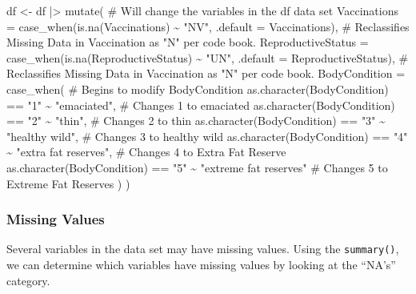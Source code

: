 \documentclass[
  letterpaper,
]{report}
\newenvironment{Shaded}{\begin{snugshade}}{\end{snugshade}}
\newcommand{\AttributeTok}[1]{\textcolor[rgb]{0.40,0.45,0.13}{#1}}
\newcommand{\CommentTok}[1]{\textcolor[rgb]{0.37,0.37,0.37}{#1}}
\newcommand{\FunctionTok}[1]{\textcolor[rgb]{0.28,0.35,0.67}{#1}}
\newcommand{\NormalTok}[1]{\textcolor[rgb]{0.00,0.23,0.31}{#1}}
\newcommand{\OtherTok}[1]{\textcolor[rgb]{0.00,0.23,0.31}{#1}}
\newcommand{\SpecialCharTok}[1]{\textcolor[rgb]{0.37,0.37,0.37}{#1}}
\newcommand{\StringTok}[1]{\textcolor[rgb]{0.13,0.47,0.30}{#1}}
\begin{document}
\begin{Shaded}
\begin{Highlighting}[]
\NormalTok{df }\OtherTok{\textless{}{-}}\NormalTok{ df }\SpecialCharTok{|\textgreater{}} \FunctionTok{mutate}\NormalTok{( }\CommentTok{\# Will change the variables in the df data set}
    \AttributeTok{Vaccinations =} \FunctionTok{case\_when}\NormalTok{(}\FunctionTok{is.na}\NormalTok{(Vaccinations) }\SpecialCharTok{\textasciitilde{}} \StringTok{"NV"}\NormalTok{, }\AttributeTok{.default =}\NormalTok{ Vaccinations), }\CommentTok{\# Reclassifies Missing Data in Vaccination as "N" per code book.}
    \AttributeTok{ReproductiveStatus =} \FunctionTok{case\_when}\NormalTok{(}\FunctionTok{is.na}\NormalTok{(ReproductiveStatus) }\SpecialCharTok{\textasciitilde{}} \StringTok{"UN"}\NormalTok{, }\AttributeTok{.default =}\NormalTok{ ReproductiveStatus), }\CommentTok{\# Reclassifies Missing Data in Vaccination as "N" per code book.}
    \AttributeTok{BodyCondition =} \FunctionTok{case\_when}\NormalTok{( }\CommentTok{\# Begins to modify BodyCondition}
        \FunctionTok{as.character}\NormalTok{(BodyCondition) }\SpecialCharTok{==} \StringTok{"1"} \SpecialCharTok{\textasciitilde{}} \StringTok{"emaciated"}\NormalTok{, }\CommentTok{\# Changes 1 to emaciated}
        \FunctionTok{as.character}\NormalTok{(BodyCondition) }\SpecialCharTok{==} \StringTok{"2"} \SpecialCharTok{\textasciitilde{}} \StringTok{"thin"}\NormalTok{, }\CommentTok{\# Changes 2 to thin}
        \FunctionTok{as.character}\NormalTok{(BodyCondition) }\SpecialCharTok{==} \StringTok{"3"} \SpecialCharTok{\textasciitilde{}} \StringTok{"healthy wild"}\NormalTok{, }\CommentTok{\# Changes 3 to healthy wild }
        \FunctionTok{as.character}\NormalTok{(BodyCondition) }\SpecialCharTok{==} \StringTok{"4"} \SpecialCharTok{\textasciitilde{}} \StringTok{"extra fat reserves"}\NormalTok{, }\CommentTok{\# Changes 4 to Extra Fat Reserve}
        \FunctionTok{as.character}\NormalTok{(BodyCondition) }\SpecialCharTok{==} \StringTok{"5"} \SpecialCharTok{\textasciitilde{}} \StringTok{"extreme fat reserves"} \CommentTok{\# Changes 5 to Extreme Fat Reserves}
\NormalTok{        )}
\NormalTok{    )}
\end{Highlighting}
\end{Shaded}

\subsubsection{Missing Values}\label{missing-values}

Several variables in the data set may have missing values. Using the
\texttt{summary()}, we can determine which variables have missing values
by looking at the ``NA's'' category.
\end{document}
